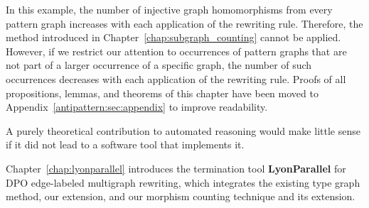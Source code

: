 \begin{center}
\end{center}
In this example, the number of injective graph homomorphisms from every pattern graph increases with each application of the rewriting rule. Therefore, the method introduced in Chapter~\ref{chap:subgraph_counting} cannot be applied. However, if we restrict our attention to occurrences of pattern graphs that are not part of a larger occurrence of a specific graph, the number of such occurrences decreases with each application of the rewriting rule. 
Proofs of all propositions, lemmas, and theorems of this chapter have been moved to Appendix~\ref{antipattern:sec:appendix} to improve readability.

A purely theoretical contribution to automated reasoning would make little sense if it did not lead to a software tool that implements it.

Chapter~\ref{chap:lyonparallel} introduces the termination tool \textbf{LyonParallel} for DPO edge-labeled multigraph rewriting, which integrates the existing type graph method, our extension, and our morphism counting technique and its extension.  